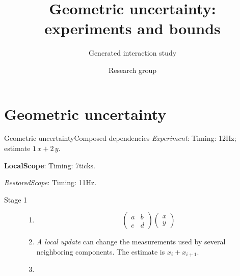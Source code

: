 \documentclass[9pt,aspectratio=43]{beamer}
\title{Geometric uncertainty: experiments and bounds}
\subtitle{Generated interaction study}
\author{Research group}
\date{}
\newcommand{\fuzzlayerA}[1]{\textit{#1}}
\newcommand{\fuzzterm}[1]{\fuzzlayerA{#1}}
\newcommand{\fuzzpair}[2]{\fuzzterm{#1}: #2}
\newcommand{\fuzzunit}{Hz}
\newcommand{\fuzzcoefficient}{1}
\newcommand{\fuzzscale}[2][\fuzzcoefficient]{#1\,#2}
\begin{document}
\section{Geometric uncertainty}
\begin{frame}[t,shrink=5]{Geometric uncertainty}{Composed dependencies}
\fuzzpair{Experiment}{Timing: 12\fuzzunit; estimate $\fuzzscale{x}+\fuzzscale[2]{y}$.}\par
{\renewcommand{\fuzzunit}{ticks}\let\fuzzterm\textbf\fuzzpair{LocalScope}{Timing: 7\fuzzunit.}\par}
\fuzzpair{RestoredScope}{Timing: 11\fuzzunit.}\par
\begin{description}
\item[Stage 1] \begin{enumerate}
\item<1-> \begin{flushleft}
\[\begin{pmatrix}a&b\\c&d\end{pmatrix}\begin{pmatrix}x\\y\end{pmatrix}\]
\end{flushleft}
\item<2-> \begin{flushright}
\begin{flushright}
\textit{A local update} can change the measurements used by several neighboring components.  The estimate is $x_i+x_{i+1}$.
\end{flushright}
\end{flushright}
\item<3-> 
\end{enumerate}
\end{description}
\end{frame}
\end{document}

